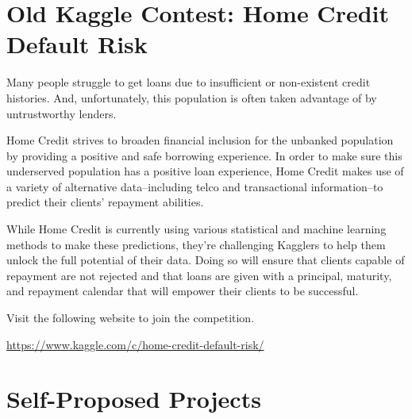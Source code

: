 \documentclass[11pt]{article}
\begin{document}
\section{Old Kaggle Contest: Home Credit Default Risk}

Many people struggle to get loans due to insufficient or non-existent credit histories. And, unfortunately, this population is often taken advantage of by untrustworthy lenders.

Home Credit strives to broaden financial inclusion for the unbanked population by providing a positive and safe borrowing experience. In order to make sure this underserved population has a positive loan experience, Home Credit makes use of a variety of alternative data--including telco and transactional information--to predict their clients' repayment abilities.

While Home Credit is currently using various statistical and machine learning methods to make these predictions, they're challenging Kagglers to help them unlock the full potential of their data. Doing so will ensure that clients capable of repayment are not rejected and that loans are given with a principal, maturity, and repayment calendar that will empower their clients to be successful.

Visit the following website to join the competition. 

\url{https://www.kaggle.com/c/home-credit-default-risk/}


\section{Self-Proposed Projects}
\end{document}
